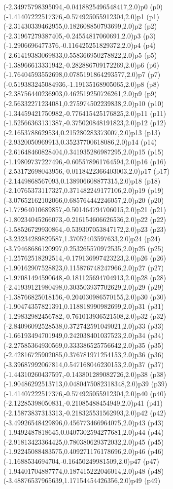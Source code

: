 \psPoint(-2.34975798395094,-0.0418825496548417,2.0){p0}
\psdot(p0)
\psPoint(-1.41407222517376,-0.574925055912304,2.0){p1}
\psdot(p1)
\psPoint(-2.31430339462955,0.182608850793699,2.0){p2}
\psdot(p2)
\psPoint(-2.31967279387405,-0.24554817060691,2.0){p3}
\psdot(p3)
\psPoint(-1.2906696477376,-0.116425251829372,2.0){p4}
\psdot(p4)
\psPoint(-2.61419383069833,0.558366950278822,2.0){p5}
\psdot(p5)
\psPoint(-1.38966613331942,-0.282886709172269,2.0){p6}
\psdot(p6)
\psPoint(-1.76404593552698,0.0785191864293577,2.0){p7}
\psdot(p7)
\psPoint(-0.519383245084936,-1.19135168905065,2.0){p8}
\psdot(p8)
\psPoint(-2.38756440236903,0.462519250726261,2.0){p9}
\psdot(p9)
\psPoint(-2.56332271234081,0.275974502239838,2.0){p10}
\psdot(p10)
\psPoint(-1.34459421750982,-0.776415425176825,2.0){p11}
\psdot(p11)
\psPoint(-1.52566363131387,-0.375020848191823,2.0){p12}
\psdot(p12)
\psPoint(-2.1653788629534,0.215280283373007,2.0){p13}
\psdot(p13)
\psPoint(-2.9320050969913,0.35237700618086,2.0){p14}
\psdot(p14)
\psPoint(-2.61648460828404,0.341935286987295,2.0){p15}
\psdot(p15)
\psPoint(-1.19809737227496,-0.605578961764594,2.0){p16}
\psdot(p16)
\psPoint(-2.53172698043956,-0.0118422366403003,2.0){p17}
\psdot(p17)
\psPoint(-2.1449868567093,0.138906608877315,2.0){p18}
\psdot(p18)
\psPoint(-2.10765373117327,0.371482249177106,2.0){p19}
\psdot(p19)
\psPoint(-3.07652162102066,0.685764442246057,2.0){p20}
\psdot(p20)
\psPoint(-1.77964010689857,-0.501464794706015,2.0){p21}
\psdot(p21)
\psPoint(-1.80234045266073,-0.216154606626536,2.0){p22}
\psdot(p22)
\psPoint(-1.58526729930864,-0.539307053847172,2.0){p23}
\psdot(p23)
\psPoint(-3.23234289829587,1.37052403597633,2.0){p24}
\psdot(p24)
\psPoint(-3.79468686120997,0.253265570972535,2.0){p25}
\psdot(p25)
\psPoint(-1.25762518292514,-0.179136997423223,2.0){p26}
\psdot(p26)
\psPoint(-1.90162907528823,0.115876748247966,2.0){p27}
\psdot(p27)
\psPoint(-1.97081494590648,-0.181125694704913,2.0){p28}
\psdot(p28)
\psPoint(-2.41939121980498,0.303503937702629,2.0){p29}
\psdot(p29)
\psPoint(-1.38766825018156,-0.204030986570155,2.0){p30}
\psdot(p30)
\psPoint(-1.90474357821391,0.118818990982699,2.0){p31}
\psdot(p31)
\psPoint(-1.29832982456782,-0.761013936521508,2.0){p32}
\psdot(p32)
\psPoint(-2.84096092528538,0.372742591049021,2.0){p33}
\psdot(p33)
\psPoint(-1.66193494701949,0.242038401037523,2.0){p34}
\psdot(p34)
\psPoint(-2.27585364930569,0.333386525756642,2.0){p35}
\psdot(p35)
\psPoint(-2.42816725902085,0.376781971254153,2.0){p36}
\psdot(p36)
\psPoint(-3.39687992067814,0.547168046230153,2.0){p37}
\psdot(p37)
\psPoint(-1.44310260437597,-0.143801289082726,2.0){p38}
\psdot(p38)
\psPoint(-1.90486292513713,0.0480475082318348,2.0){p39}
\psdot(p39)
\psPoint(-1.41407222517376,-0.574925055912304,2.0){p40}
\psdot(p40)
\psPoint(-2.12285398050831,-0.21085488454949,2.0){p41}
\psdot(p41)
\psPoint(-2.15873837313313,-0.218325531562993,2.0){p42}
\psdot(p42)
\psPoint(-3.49926548429896,0.456773466964075,2.0){p43}
\psdot(p43)
\psPoint(-1.9492487818645,0.0407302594277681,2.0){p44}
\psdot(p44)
\psPoint(-2.91813423364425,0.780380629372032,2.0){p45}
\psdot(p45)
\psPoint(-1.92245088483575,0.409271176178696,2.0){p46}
\psdot(p46)
\psPoint(-1.1688534694704,-0.16450249981509,2.0){p47}
\psdot(p47)
\psPoint(-1.94401704887774,0.187415222046014,2.0){p48}
\psdot(p48)
\psPoint(-3.48876537965639,1.17154454426356,2.0){p49}
\psdot(p49)
